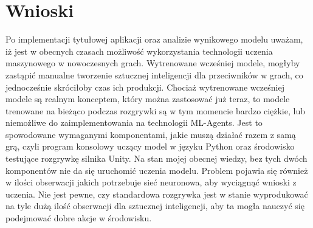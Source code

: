 \documentclass{SGGW-thesis}
\begin{document}
\section{Wnioski}
Po implementacji tytułowej aplikacji oraz analizie wynikowego modelu uważam, iż jest w obecnych czasach możliwość wykorzystania technologii uczenia maszynowego w nowoczesnych grach. Wytrenowane wcześniej modele, mogłyby
zastąpić manualne tworzenie sztucznej inteligencji dla przeciwników w grach, co jednocześnie skróciłoby czas ich produkcji.
Chociaż wytrenowane wcześniej modele są realnym konceptem, który można zastosować już teraz,
to modele trenowane na bieżąco podczas rozgrywki są w tym momencie bardzo ciężkie, lub niemożliwe do zaimplementowania na technologii ML-Agents.
Jest to spowodowane wymaganymi komponentami, jakie muszą działać razem z samą grą, czyli program konsolowy uczący model w języku Python oraz środowisko testujące rozgrywkę silnika Unity.
Na stan mojej obecnej wiedzy, bez tych dwóch komponentów nie da się uruchomić uczenia modelu. Problem pojawia się również w ilości obserwacji jakich potrzebuje sieć neuronowa, aby wyciągnąć wnioski z uczenia.
Nie jest pewne, czy standardowa rozgrywka jest w stanie wyprodukować na tyle dużą ilość obserwacji dla sztucznej inteligencji, aby ta mogła nauczyć się podejmować dobre akcje w środowisku. 
\end{document}
